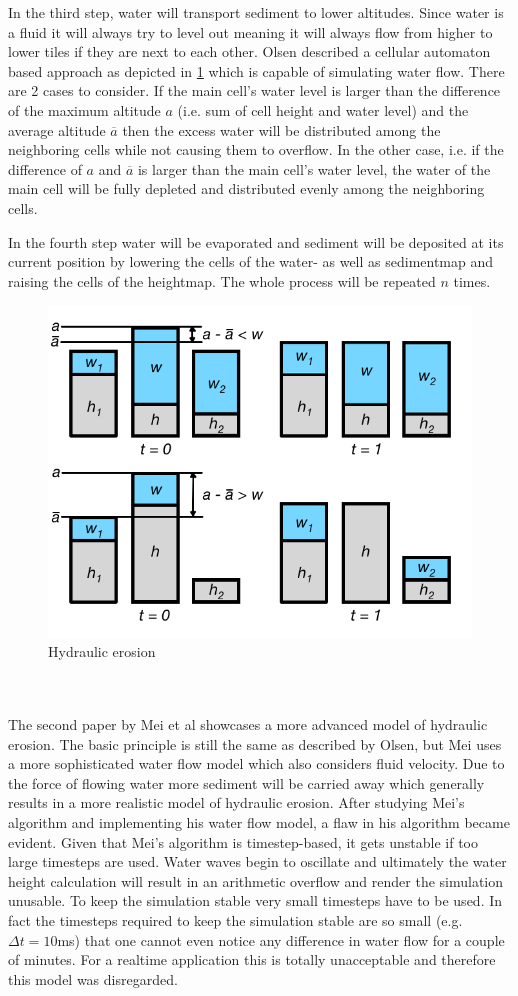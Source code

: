 \documentclass[11pt,a4paper,twoside,openright]{report}
\begin{document}
In the third step, water will transport sediment to lower altitudes. Since water is a fluid it will always try to level out meaning it will always flow from higher to lower tiles if they are next to each other. Olsen described a cellular automaton based approach as depicted in \cref{fig:hydrolicerosion} which is capable of simulating water flow. There are 2 cases to consider. If the main cell's water level is larger than the difference of the maximum altitude $a$ (i.e. sum of cell height and water level) and the average altitude $\overline{a}$ then the excess water will be distributed among the neighboring cells while not causing them to overflow. In the other case, i.e. if the difference of $a$ and $\overline{a}$ is larger than the main cell's water level, the water of the main cell will be fully depleted and distributed evenly among the neighboring cells.

In the fourth step water will be evaporated and sediment will be deposited at its current position by lowering the cells of the water- as well as sedimentmap and raising the cells of the heightmap. The whole process will be repeated $n$ times.
\begin{figure}[h]
\centering
\includegraphics[width=0.65\linewidth]{hydraulicerosion.png}
\caption{Hydraulic erosion}\label{fig:hydrolicerosion}
\end{figure}
\\
\\
The second paper \cite{mei:inria-00402079} by Mei et al showcases a more advanced model of hydraulic erosion. The basic principle is still the same as described by Olsen, but Mei uses a more sophisticated water flow model which also considers fluid velocity. Due to the force of flowing water more sediment will be carried away which generally results in a more realistic model of hydraulic erosion. After studying Mei's algorithm and implementing his water flow model, a flaw in his algorithm became evident. Given that Mei's algorithm is timestep-based, it gets unstable if too large timesteps are used. Water waves begin to oscillate and ultimately the water height calculation will result in an arithmetic overflow and render the simulation unusable. To keep the simulation stable very small timesteps have to be used. In fact the timesteps required to keep the simulation stable are so small (e.g. $\Delta t = 10$ms) that one cannot even notice any difference in water flow for a couple of minutes. For a realtime application this is totally unacceptable and therefore this model was disregarded.
\end{document}
